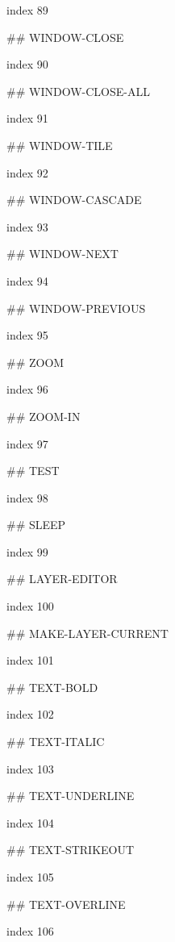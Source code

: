 index 89



## WINDOW-CLOSE

index 90



## WINDOW-CLOSE-ALL

index 91



## WINDOW-TILE

index 92



## WINDOW-CASCADE

index 93



## WINDOW-NEXT

index 94



## WINDOW-PREVIOUS

index 95



## ZOOM

 index 96



## ZOOM-IN

index 97



## TEST

 index 98



## SLEEP

index 99



## LAYER-EDITOR

index 100



## MAKE-LAYER-CURRENT

index 101



## TEXT-BOLD

index 102



## TEXT-ITALIC

index 103



## TEXT-UNDERLINE

index 104



## TEXT-STRIKEOUT

index 105



## TEXT-OVERLINE

index 106



